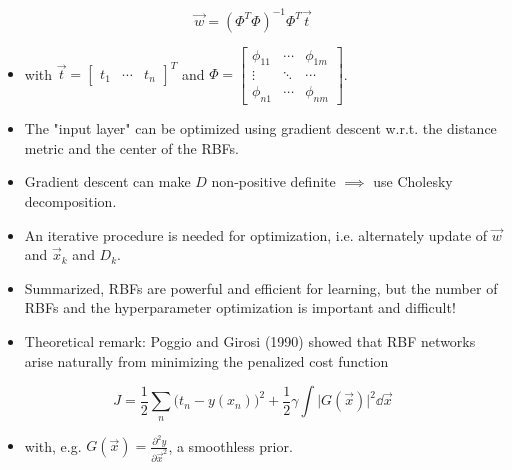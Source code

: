 		\begin{equation}
			\vec{w} = (\Phi^T \Phi)^{-1} \Phi^T \vec{t}
		\end{equation}
		\begin{itemize}
			\item[] with \( \vec{t} = \begin{bmatrix} t_1 & \cdots & t_n \end{bmatrix}^T \) and \( \Phi = \begin{bmatrix}
				\phi_{11} & \cdots & \phi_{1m} \\
				\vdots & \ddots & \cdots \\
				\phi_{n1} & \cdots & \phi_{nm}
				\end{bmatrix} \).
			\item The "input layer" can be optimized using gradient descent w.r.t. the distance metric and the center of the RBFs.
			\item Gradient descent can make \(D\) non-positive definite \(\implies\) use Cholesky decomposition.
			\item An iterative procedure is needed for optimization, i.e. alternately update of \(\vec{w}\) and \(\vec{x}_k\) and \(D_k\).
			\item Summarized, RBFs are powerful and efficient for learning, but the number of RBFs and the hyperparameter optimization is important and difficult!
			\item Theoretical remark: Poggio and Girosi (1990) showed that RBF networks arise naturally from minimizing the penalized cost function
		\end{itemize}
		\begin{equation}
			J = \frac{1}{2} \sum_n \big(t_n - y(x_n)\big)^2 + \frac{1}{2} \gamma \int \big\lvert G(\vec{x}) \big\rvert^2 \dd{\vec{x}}
		\end{equation}
		\begin{itemize}
			\item[] with, e.g. \( G(\vec{x}) = \frac{\partial^2 y}{\partial \vec{x}^2} \), a smoothless prior.
		\end{itemize}
	
